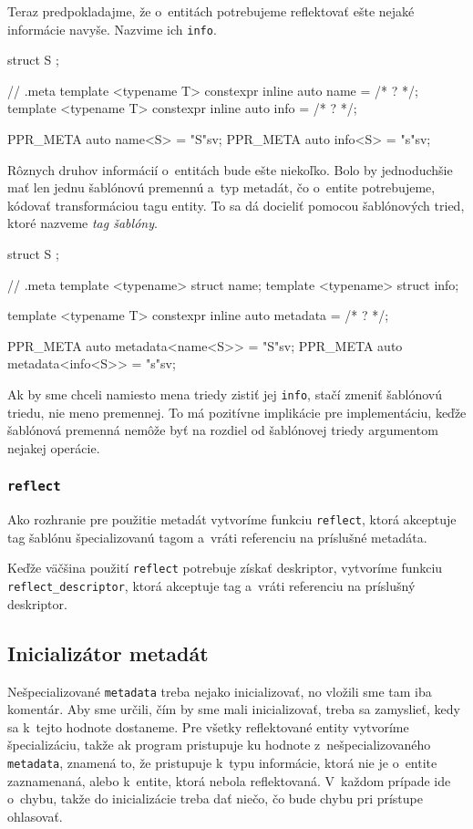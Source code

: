 Teraz predpokladajme, že o~entitách potrebujeme reflektovať ešte nejaké informácie navyše. Nazvime ich \texttt{info}.
\begin{code}
struct S {};

// .meta
template <typename T> constexpr inline auto name = /* ? */;
template <typename T> constexpr inline auto info = /* ? */;

PPR_META auto name<S> = "S"sv;
PPR_META auto info<S> = "s"sv;
\end{code}
Rôznych druhov informácií o~entitách bude ešte niekoľko. Bolo by jednoduchšie mať len jednu šablónovú premennú a~typ metadát, čo o~entite potrebujeme, kódovať transformáciou tagu entity. To sa dá docieliť pomocou šablónových tried, ktoré nazveme \emph{tag šablóny}.
\begin{code}
struct S {};

// .meta
template <typename> struct name;
template <typename> struct info;

template <typename T>
constexpr inline auto metadata = /* ? */;

PPR_META auto metadata<name<S>> = "S"sv;
PPR_META auto metadata<info<S>> = "s"sv;
\end{code}
Ak by sme chceli namiesto mena triedy zistiť jej \texttt{info}, stačí zmeniť šablónovú triedu, nie meno premennej. To má pozitívne implikácie pre implementáciu, keďže šablónová premenná nemôže byť na rozdiel od šablónovej triedy argumentom nejakej operácie.

\subsubsection{\texttt{reflect}}

Ako rozhranie pre použitie metadát vytvoríme funkciu \texttt{reflect}, ktorá akceptuje tag šablónu špecializovanú tagom a~vráti referenciu na príslušné metadáta.

Keďže väčšina použití \texttt{reflect} potrebuje získať deskriptor, vytvoríme funk\-ciu \texttt{reflect\_descriptor}, ktorá akceptuje tag a~vráti referenciu na príslušný deskriptor.

\subsection{Inicializátor metadát}
Nešpecializované \texttt{metadata} treba nejako inicializovať, no vložili sme tam iba komentár. Aby sme určili, čím by sme mali inicializovať, treba sa zamyslieť, kedy sa k~tejto hodnote dostaneme. Pre všetky reflektované entity vytvoríme špecializáciu, takže ak program pristupuje ku hodnote z~nešpecializovaného \texttt{metadata}, znamená to, že pristupuje k~typu informácie, ktorá nie je o~entite zaznamenaná, alebo k~entite, ktorá nebola reflektovaná. V~každom prípade ide o~chybu, takže do inicializácie treba dať niečo, čo bude chybu pri prístupe ohlasovať.


